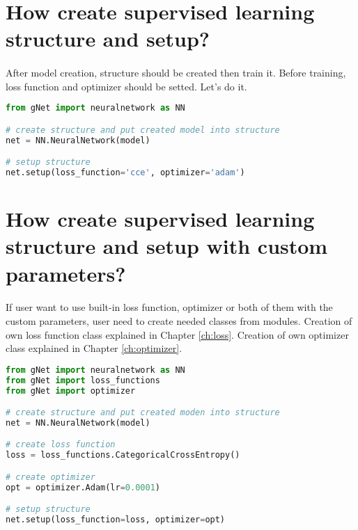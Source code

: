 \documentclass[12pt]{report}
\begin{document}
\section{How create supervised learning structure and setup?}
\paragraph{}
After model creation, structure should be created then train it. Before training, loss function and optimizer should be setted. Let's do it.

\begin{lstlisting}[language=Python, numbers=none, caption={Set loss function and optimizer.}, label={ex:setup}]
from gNet import neuralnetwork as NN

# create structure and put created model into structure
net = NN.NeuralNetwork(model)

# setup structure
net.setup(loss_function='cce', optimizer='adam')

\end{lstlisting}




\section{How create supervised learning structure and setup with custom parameters?}
\paragraph{}
If user want to use built-in loss function, optimizer or both of them with the custom parameters, user need to create needed classes from modules. Creation of own loss function class explained in Chapter \ref{ch:loss}. Creation of own optimizer class explained in Chapter \ref{ch:optimizer}.

\begin{lstlisting}[language=Python, numbers=none, caption={Set loss function and optimizer with custom parameters.}, label={ex:setup-custom}]
from gNet import neuralnetwork as NN
from gNet import loss_functions
from gNet import optimizer

# create structure and put created moden into structure
net = NN.NeuralNetwork(model)

# create loss function
loss = loss_functions.CategoricalCrossEntropy()

# create optimizer 
opt = optimizer.Adam(lr=0.0001)

# setup structure
net.setup(loss_function=loss, optimizer=opt)

\end{lstlisting}
\end{document}

